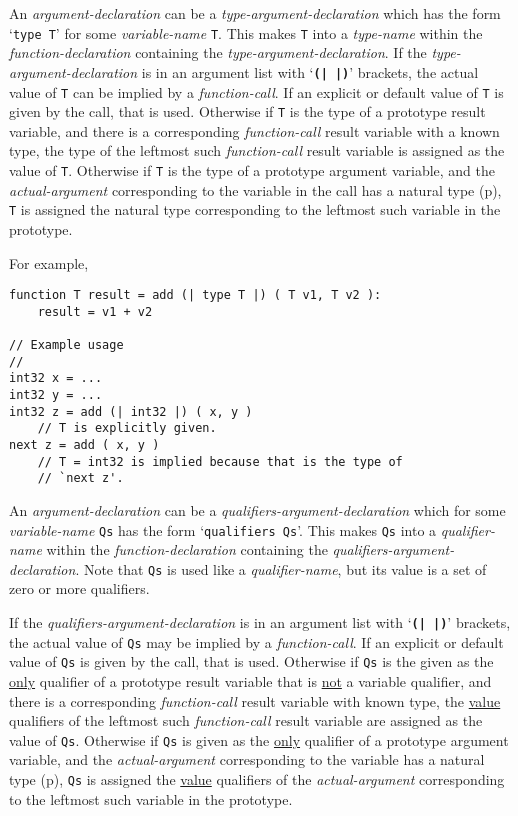 \documentclass[12pt]{article}
\newcommand{\TT}[1]{{\tt \bfseries #1}}
\newcommand{\pagref}[1]{p\pageref{#1}}
\newenvironment{indpar}[1][0.3in]%
	{\begin{list}{}%
		     {\setlength{\itemsep}{0in}%
		      \setlength{\topsep}{0in}%
		      \setlength{\parsep}{1ex}%
		      \setlength{\labelwidth}{#1}%
		      \setlength{\leftmargin}{#1}%
		      \addtolength{\leftmargin}{\labelsep}}%
	 \item}%
	{\end{list}}
\begin{document}
An {\em argument-declaration} can be a {\em type-argument-declaration}
which has the form `{\tt type T}' for some {\em variable-name} {\tt T}.
This makes {\tt T} into a {\em type-name} within the {\em function-declaration}
containing the {\em type-argument-declaration}.
If the {\em type-argument-declaration} is
in an argument list with `\TT{(|~|)}' brackets,
the actual value of {\tt T} can be implied by a {\em function-call}.
If an explicit or default value of {\tt T} is given by the call, that is used.
Otherwise if {\tt T} is the type of a prototype result variable, and there
is a corresponding {\em function-call} result variable with a known type,
the type of the leftmost such {\em function-call} result variable
is assigned as the value of {\tt T}.  Otherwise
if {\tt T} is the type of a prototype argument variable, and
the {\em actual-argument} corresponding to the variable in the call has
a natural type (\pagref{NATURAL-TYPE}), {\tt T} is assigned the natural type
corresponding to the leftmost such variable in the prototype.


For example,
\begin{indpar}\begin{verbatim}
function T result = add (| type T |) ( T v1, T v2 ):
    result = v1 + v2

// Example usage
//
int32 x = ...
int32 y = ...
int32 z = add (| int32 |) ( x, y )
    // T is explicitly given.
next z = add ( x, y )
    // T = int32 is implied because that is the type of
    // `next z'.
\end{verbatim}\end{indpar}

An {\em argument-declaration} can be a {\em qualifiers-argument-declaration}
\label{QUALIFIERS-ARGUMENT-DECLARATION-DISCUSSION}
which for some {\em variable-name} {\tt Qs}
has the form `{\tt qualifiers Qs}'.
This makes {\tt Qs} into a {\em qualifier-name}
within the {\em function-de\-clar\-a\-tion}
containing the {\em qualifiers-argument-declaration}.  Note that {\tt Qs}
is used like a {\em qualifier-name}, but its value is a set of
zero or more qualifiers.

If the {\em qualifiers-argument-declaration} is
in an argument list with `\TT{(|~|)}' brackets,
the actual value of {\tt Qs} may be implied by a {\em function-call}.
If an explicit or default value of {\tt Qs} is given by the call, that is used.
Otherwise if {\tt Qs} is the given as the \underline{only} qualifier
of a prototype result variable that is \underline{not} a variable
qualifier, and there is a corresponding {\em function-call}
result variable with known type,
the \underline{value} qualifiers of the leftmost such {\em function-call}
result variable are
assigned as the value of {\tt Qs}.  Otherwise
if {\tt Qs} is given as the \underline{only} qualifier
of a prototype argument variable,
and the {\em actual-argument} corresponding to the
variable has a natural type (\pagref{NATURAL-TYPE}),
{\tt Qs} is assigned the \underline{value} qualifiers of the
{\em actual-argument} corresponding to the
leftmost such variable in the prototype.
\end{document}
